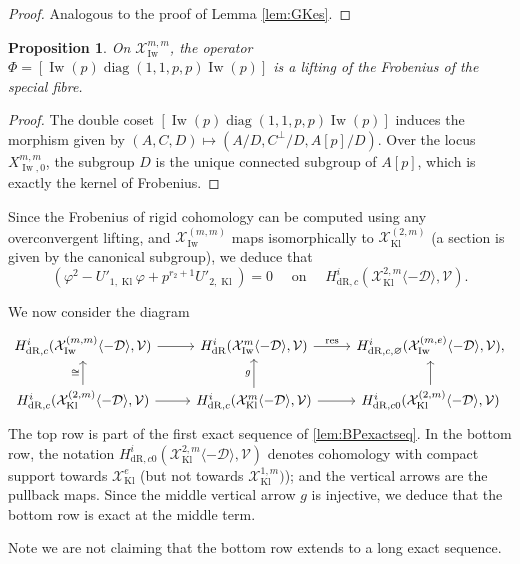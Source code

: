 \documentclass[cjm]{ipart}
\theoremstyle{plain}
\newtheorem{proposition}[theorem]{Proposition}
\theoremstyle{remark}
\DeclareMathOperator{\diag}{diag}
\DeclareMathOperator{\Iw}{Iw}
\DeclareMathOperator{\Kl}{Kl}
\newcommand{\cD}{\mathcal{D}}
\newcommand{\cV}{\mathcal{V}}
\newcommand{\cX}{\mathcal{X}}
\newcommand{\dR}{\mathrm{dR}}
\newcommand{\res}{\mathrm{res}}
\numberwithin{equation}{subsection}
\renewcommand{\emptyset}{\varnothing}
\begin{document}
  \begin{proof}
   Analogous to the proof of Lemma \ref{lem:GKes}.
  \end{proof}

  \begin{proposition}
   On $\cX^{m,m}_{\Iw}$, the operator $\Phi = \left[ \Iw(p) \diag(1, 1, p, p) \Iw(p)\right]$ is a lifting of the Frobenius of the special fibre.
  \end{proposition}

  \begin{proof}
   The double coset $\left[ \Iw(p) \diag(1, 1, p, p) \Iw(p)\right]$ induces the morphism given by $(A, C, D) \mapsto \left(A/D, C^\perp/D, A[p] / D\right)$. Over the locus $X^{m,m}_{\Iw, 0}$, the subgroup $D$ is the unique connected subgroup of $A[p]$, which is exactly the kernel of Frobenius.
  \end{proof}

  Since the Frobenius of rigid cohomology can be computed using any overconvergent lifting, and $\cX^{(m,m)}_{\Iw}$ maps isomorphically to $\cX_{\Kl}^{(2, m)}$ (a section is given by the canonical subgroup), we deduce that
  \[ \left(\varphi^2 - U'_{1, \Kl} \varphi + p^{r_2 + 1} U'_{2, \Kl}\right) = 0 \quad\text{ on }\quad H^i_{\dR,c} (\cX^{2, m}_{\Kl}\langle -\cD\rangle, \cV).\]

  We now consider the diagram
  \[
   \begin{tikzcd}
    H^i_{\dR,c} (\cX^{(m,m)}_{\Iw}\langle -\cD\rangle,\cV)\rar &H^i_{\dR}(\cX^m_{\Iw}\langle -\cD\rangle,\cV)\rar["\res"] &H^i_{\dR,c,\emptyset}(\cX_{\Iw}^{(m,e)}\langle -\cD\rangle,\cV),\\
    H^i_{\dR,c} (\cX^{(2, m)}_{\Kl}\langle -\cD\rangle,\cV)  \rar \uar["\cong"] &H^i_{\dR,c}(\cX^m_{\Kl}\langle -\cD\rangle,\cV) \rar \uar["g"] &H^i_{\dR,c0}(\cX_{\Kl}^{(2, m)}\langle -\cD\rangle,\cV) \uar
   \end{tikzcd}
  \]
  The top row is part of the first exact sequence of \cref{lem:BPexactseq}. In the bottom row, the notation $H^i_{\dR,c0}(\cX_{\Kl}^{2, m}\langle -\cD\rangle,\cV)$ denotes cohomology with compact support towards $\cX_{\Kl}^e$ (but not towards $\cX_{\Kl}^{1, m})$); and the vertical arrows are the pullback maps. Since the middle vertical arrow $g$ is injective, we deduce that the bottom row is exact at the middle term.

  \begin{remark}
   Note we are not claiming that the bottom row extends to a long exact sequence.
  \end{remark}
\end{document}
